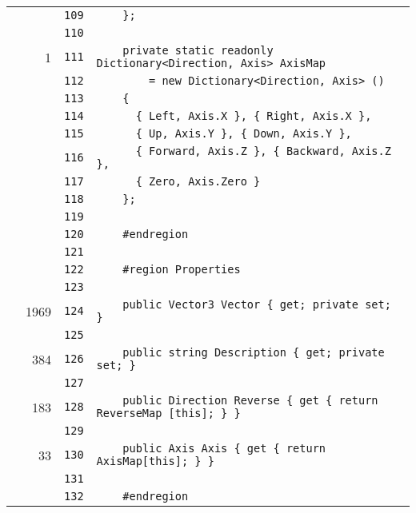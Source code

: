 \documentclass[a4paper,10pt]{article}
\begin{document}
\begin{longtable}[l]{lrrl}
\cellcolor{gray} &  & \verb~109~ & \verb~    };~\\
\cellcolor{gray} &  & \verb~110~ & \verb~~\\
\cellcolor{green} & 1 & \verb~111~ & \verb~    private static readonly Dictionary<Direction, Axis> AxisMap~\\
\cellcolor{gray} &  & \verb~112~ & \verb~        = new Dictionary<Direction, Axis> ()~\\
\cellcolor{gray} &  & \verb~113~ & \verb~    {~\\
\cellcolor{gray} &  & \verb~114~ & \verb~      { Left, Axis.X }, { Right, Axis.X },~\\
\cellcolor{gray} &  & \verb~115~ & \verb~      { Up, Axis.Y }, { Down, Axis.Y },~\\
\cellcolor{gray} &  & \verb~116~ & \verb~      { Forward, Axis.Z }, { Backward, Axis.Z },~\\
\cellcolor{gray} &  & \verb~117~ & \verb~      { Zero, Axis.Zero }~\\
\cellcolor{gray} &  & \verb~118~ & \verb~    };~\\
\cellcolor{gray} &  & \verb~119~ & \verb~~\\
\cellcolor{gray} &  & \verb~120~ & \verb~    #endregion~\\
\cellcolor{gray} &  & \verb~121~ & \verb~~\\
\cellcolor{gray} &  & \verb~122~ & \verb~    #region Properties~\\
\cellcolor{gray} &  & \verb~123~ & \verb~~\\
\cellcolor{green} & 1969 & \verb~124~ & \verb~    public Vector3 Vector { get; private set; }~\\
\cellcolor{gray} &  & \verb~125~ & \verb~~\\
\cellcolor{green} & 384 & \verb~126~ & \verb~    public string Description { get; private set; }~\\
\cellcolor{gray} &  & \verb~127~ & \verb~~\\
\cellcolor{green} & 183 & \verb~128~ & \verb~    public Direction Reverse { get { return ReverseMap [this]; } }~\\
\cellcolor{gray} &  & \verb~129~ & \verb~~\\
\cellcolor{green} & 33 & \verb~130~ & \verb~    public Axis Axis { get { return AxisMap[this]; } }~\\
\cellcolor{gray} &  & \verb~131~ & \verb~~\\
\cellcolor{gray} &  & \verb~132~ & \verb~    #endregion~\\

\end{longtable}
\end{document}
